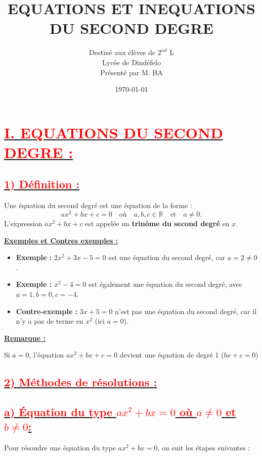 \documentclass[12pt]{article}
\author{Destiné aux élèves de $2^{nd}$ L\\Lycée de Dindéfelo\\Présenté par M. BA}
\title{\textbf{EQUATIONS ET INEQUATIONS DU SECOND DEGRE}}
\date{\today}
\newcounter{exemple}
\newcounter{solution}
\begin{document}
\maketitle

\section*{\underline{\textbf{\textcolor{red}{I. EQUATIONS DU SECOND DEGRE :}}}}

\subsection*{\underline{\textbf{\textcolor{red}{1) Définition :}}}}
Une équation du second degré est une équation de la forme :
\[
ax^2 + bx + c = 0 \quad \text{où} \quad a, b, c \in \mathbb{R} \quad \text{et} \quad a \neq 0.
\]
L'expression \( ax^2 + bx + c \) est appelée un \textbf{trinôme du second degré} en \( x \).


\textbf{\underline{Exemples et Contres exemples :}}
\begin{itemize}
    \item \textbf{Exemple :} \( 2x^2 + 3x - 5 = 0 \) est une équation du second degré, car \( a = 2 \neq 0 \).
    \item \textbf{Exemple :} \( x^2 - 4 = 0 \) est également une équation du second degré, avec \( a = 1, b = 0, c = -4 \).
    \item \textbf{Contre-exemple :} \( 3x + 5 = 0 \) n'est pas une équation du second degré, car il n'y a pas de terme en \( x^2 \) (ici \( a = 0 \)).
\end{itemize}

\textbf{\underline{Remarque :}}

Si \( a = 0 \), l'équation \( ax^2 + bx + c = 0 \) devient une équation de degré 1 (\( bx + c = 0 \))

\subsection*{\underline{\textbf{\textcolor{red}{2) Méthodes de résolutions :}}}}

\subsection*{\underline{\textbf{\textcolor{red}{a) Équation du type \( ax^2 + bx = 0 \) où \( a \neq 0 \) et \( b \neq 0 \):}}}}

Pour résoudre une équation du type \( ax^2 + bx = 0 \), on suit les étapes suivantes :
\end{document}

